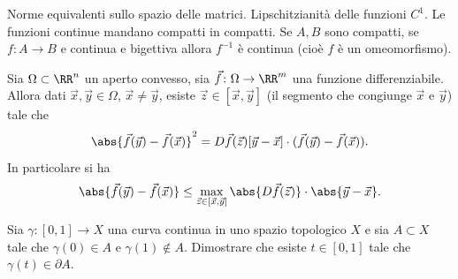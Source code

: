Norme equivalenti sullo spazio delle matrici. Lipschitzianità delle funzioni $C^1$.
Le funzioni continue mandano compatti in compatti.
Se $A,B$ sono compatti, se $f\colon A\to B$ e continua e bigettiva allora 
$f^{-1}$ è continua (cioè $f$ è un omeomorfismo).


\begin{theorem}
  \label{th:lagrange}
Sia $\Omega\subset \RR^n$ un aperto convesso, 
sia $\vec f\colon \Omega\to \RR^m$ una funzione differenziabile.
Allora dati $\vec x,\vec y \in \Omega$, $\vec x\neq \vec y$, 
esiste $\vec z \in [\vec x,\vec y]$ (il segmento che congiunge $\vec x$ e $\vec y$)
tale che 
\[
 \abs{\vec f(\vec y)- \vec f(\vec x)}^2
 =  D\vec f(\vec z)[\vec y-\vec x]\cdot (\vec f(\vec y)-\vec f(\vec x)).
\]
In particolare si ha 
\[
\abs{\vec f(\vec y)- \vec f(\vec x)}
\le \max_{\vec z\in [\vec x,\vec y]} \abs{D\vec f(\vec z)} \cdot \abs{\vec y-\vec x}.
\]
\end{theorem}

\begin{exercise}
  \label{ex:punto-di-frontiera}
Sia $\gamma\colon [0,1] \to X$ una curva continua in uno 
spazio topologico $X$ e sia $A\subset X$ tale che 
$\gamma(0)\in A$ e $\gamma(1)\notin A$.
Dimostrare che esiste $t \in [0,1]$ tale che $\gamma(t) \in \partial A$.
\end{exercise}



